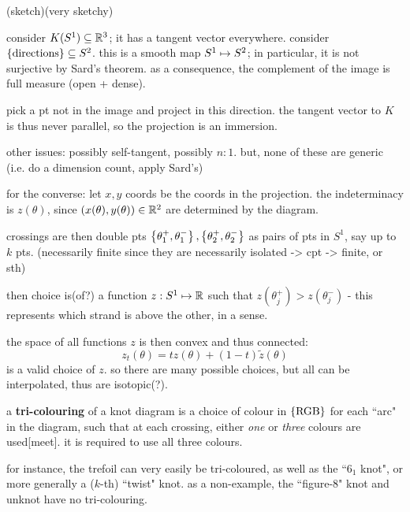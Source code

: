 \begin{pf}[source=Primary Source Material]
    (sketch)(very sketchy)

    consider $K(S^{1})\subseteq\mathbb{R}^{3}$; it has a tangent vector everywhere.
    consider $\left\{{\textrm{directions}}\right\}\subseteq S^{2}$.
    this is a smooth map $S^{1}\mapsto S^{2}$; in particular, it is not surjective
    by Sard's theorem.
    as a consequence, the complement of the image is full measure (open + dense).

    pick a pt not in the image and project in this direction.
    the tangent vector to $K$ is thus never parallel, so the projection is an
    immersion.

    other issues: possibly self-tangent, possibly $n:1$.
    but, none of these are generic (i.e. do a dimension count, apply Sard's)

    for the converse:
    let $x,y$ coords be the coords in the projection.
    the indeterminacy is $z(\theta)$, since $(x(\theta),y(\theta))\in\mathbb{R}^{2}$
    are determined by the diagram.

    crossings are then double pts
    $\left\{{\theta_{1}^{+},\theta_{1}^{-}}\right\},\left\{{\theta_{2}^{+},\theta_{2}^{-}}\right\}$
    as pairs of pts in $S^{1}$, say up to $k$ pts.
    (necessarily finite since they are necessarily isolated -> cpt -> finite,
    or sth)

    then choice is(of?) a function $z:S^{1}\mapsto\mathbb{R}$ such that
    $z(\theta_{j}^{+})>z(\theta_{j}^{-})$ - this represents which strand is above
    the other, in a sense.

    the space of all functions $z$ is then convex and thus connected:
    \begin{equation*}
        z_{t}(\theta)=tz(\theta)+(1-t)\tilde{z}(\theta)
    \end{equation*}
    is a valid choice of $z$.
    so there are many possible choices, but all can be interpolated, thus are
    isotopic(?).
\end{pf}

\begin{defn}
    a \textbf{tri-colouring} of a knot diagram is a choice of colour in
    $\left\{{\textrm{RGB}}\right\}$ for each ``arc" in the diagram, such that at each crossing,
    either \textit{one} or \textit{three} colours are used[meet].
    it is required to use all three colours.
\end{defn}

for instance, the trefoil can very easily be tri-coloured, as well as the
``$6_{1}$ knot", or more generally a ($k$-th) ``twist" knot.
as a non-example, the ``figure-8" knot and unknot have no tri-colouring.

